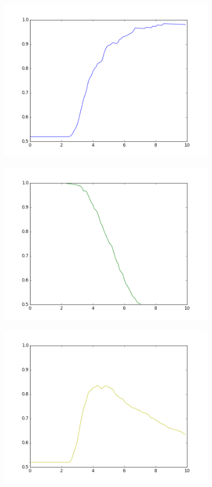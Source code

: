 \documentclass[information,article,submit,moreauthors,pdftex,10pt,a4paper]{Definitions/mdpi}
\begin{document}
\begin{figure}[H]
 \centering
 \begin{subfigure}[b]{0.49\linewidth}
   \includegraphics[width=\linewidth]{precision}
 \end{subfigure}
 \begin{subfigure}[b]{0.49\linewidth}
   \includegraphics[width=\linewidth]{recall}
 \end{subfigure}
 \begin{subfigure}[b]{0.49\linewidth}
   \includegraphics[width=\linewidth]{accuracy}

\end{subfigure}
\end{figure}
\end{document}
